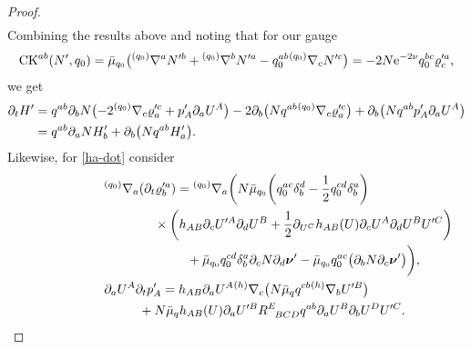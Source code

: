 \documentclass[11pt]{article}
\numberwithin{equation}{section}
\def\ptl{\partial}%
\def\mbo#1{\boldsymbol{#1}}%
\def\grad{{\nabla}}%
\newcommand{\leftexp}[2]{{\vphantom{#2}}^{#1}{#2}}
\def\halb{\frac{1}{2}}%
\numberwithin{equation}{section}
\begin{document}
\begin{proof}
\begin{gather*}
\end{gather*}
Combining the results above and noting that for our gauge
\begin{align*}
{\rm CK}^{ab} (N', q_0) = \bar{\mu}_{q_0} \bigl(\leftexp{(q_0)}{\grad}^a N'^b + \leftexp{(q_0)}{\grad}^b N'^a - q^{ab}_0 \leftexp{(q_0)}{\grad}_c N'^c\bigr) = - 2 N {\rm e}^{-2 \nu} q^{bc}_0 \varrho'^a_c,
\end{align*}
we get
\begin{align*}
\ptl_t H' &{}= q^{ab} \ptl_b N \bigl(-2 \leftexp{(q_0)}{\grad}_c \varrho'^c_a + p'_A \ptl_a U^A\bigr) -2 \ptl_b \bigl(N q^{ab} \leftexp{(q_0)}{\grad}_c \varrho'^c_a\bigr) + \ptl_b \bigl(N q^{ab} p'_A \ptl_a U^A\bigr) \\
&{}= q^{ab} \ptl_a N H'_b + \ptl_b \bigl(N q^{ab} H'_a\bigr).
\end{align*}
Likewise, for \eqref{ha-dot} consider
\begin{gather*}
 \leftexp{(q_0)}{\grad}_a (\ptl_t \varrho'^a_b) = \leftexp{(q_0)}{\grad}_a \biggl(N \bar{\mu}_{q_0} \biggl(q^{ac}_0 \delta^d_b - \halb q_0^{cd} \delta^a_b\biggr)\notag\\ \hphantom{\leftexp{(q_0)}{\grad}_a (\ptl_t \varrho'^a_b) =\leftexp{(q_0)}{\grad}_a \biggl(}{}
 \times\biggl(h_{AB} \ptl_c U'^A \ptl_d U^B+ \halb \ptl_{U^C} h_{AB} (U) \ptl_c U^A \ptl_d U^B U'^C\biggr) \notag\\
 \hphantom{\leftexp{(q_0)}{\grad}_a (\ptl_t \varrho'^a_b) =\leftexp{(q_0)}{\grad}_a \biggl(}{}
 +\bar{\mu}_{q_0} q_0^{cd} \delta^a_b \ptl_c N \ptl_d \mbo{\nu}' - \bar{\mu}_{q_0} q^{ac}_0 \bigl(\ptl_b N \ptl_c \mbo{\nu}'\bigr) \biggr), \\
\ptl_a U^A \ptl_t p'_A = h_{AB} \ptl_a U^A \leftexp{(h)}{\grad}_c \bigl(N \bar{\mu}_q q^{cb} \leftexp{(h)}{\grad}_b U'^B\bigr) \notag\\ \hphantom{\ptl_a U^A \ptl_t p'_A =}{}
+ N \bar{\mu}_q h_{AB} (U) \ptl_a U'^B R^{E}_{\,\,\,\,BCD} q^{ab} \ptl_a U^B \ptl_b U^D U'^C.
\end{gather*}


\end{proof}
\end{document}
